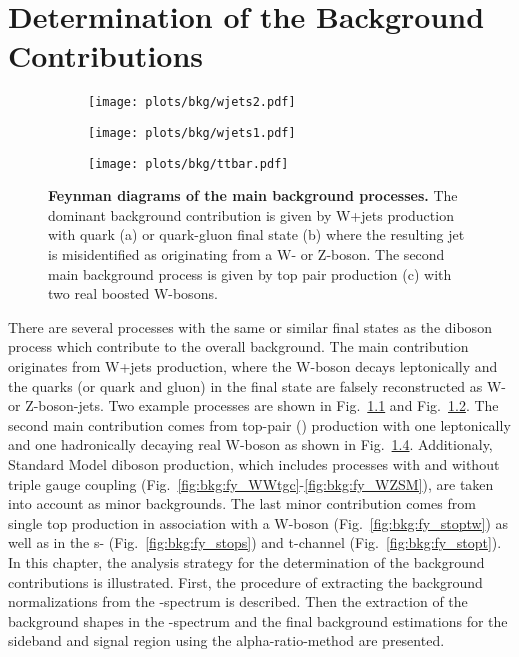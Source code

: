 \chapter{Determination of the Background Contributions}
\label{chap:DeterminationoftheBackgroundContributions}
\begin{figure}[Hb]
	\centering
	\begin{subfigure}{0.4\textwidth}
		\texttt{[image: plots/bkg/wjets2.pdf]}
		\caption{}
		\label{fig:bkg:fy_wjets1}
	\end{subfigure}
	\begin{subfigure}{0.4\textwidth}
		\texttt{[image: plots/bkg/wjets1.pdf]}
		\caption{}
		\label{fig:bkg:fy_wjets2}
	\end{subfigure}
	\begin{subfigure}{0.4\textwidth}
		\texttt{[image: plots/bkg/ttbar.pdf]}
		\caption{}
		\label{fig:bkg:fy_ttbar}
	\end{subfigure}
	\caption[Feynman diagrams of the main background processes.]{\textbf{Feynman diagrams of the main background processes.} The dominant background contribution is given by W+jets production with quark (a) or quark-gluon final state (b) where the resulting jet is misidentified as originating from a W- or Z-boson. The second main background process is given by top pair production (c) with two real boosted W-bosons.}
\end{figure}
There are several processes with the same or similar final states as the diboson process which contribute to the overall background. The main contribution originates from W+jets production, where the W-boson decays leptonically and the quarks (or quark and gluon) in the final state are falsely reconstructed as W- or Z-boson-jets. Two example processes are shown in Fig.~\ref{fig:bkg:fy_wjets1} and Fig.~\ref{fig:bkg:fy_wjets2}. The second main contribution comes from top-pair (\ttbar) production with one leptonically and one hadronically decaying real W-boson as shown in Fig.~\ref{fig:bkg:fy_ttbar}. Additionaly, Standard Model diboson production, which includes processes with and without triple gauge coupling (Fig.~\ref{fig:bkg:fy_WWtgc}-\ref{fig:bkg:fy_WZSM}), are taken into account as minor backgrounds. The last minor contribution comes from single top production in association with a W-boson (Fig.~\ref{fig:bkg:fy_stoptw}) as well as in the s- (Fig.~\ref{fig:bkg:fy_stops}) and t-channel (Fig.~\ref{fig:bkg:fy_stopt}).\\
In this chapter, the analysis strategy for the determination of the background contributions is illustrated.  First, the procedure of extracting the background normalizations from the \Mpr -spectrum is described. Then the extraction of the background shapes in the \MWV -spectrum and the final background estimations for the sideband and signal region using the alpha-ratio-method are presented.

